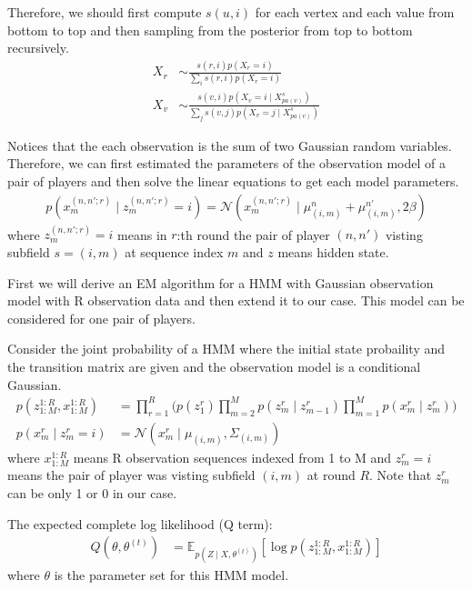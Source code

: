 \documentclass[12pt]{article}
\newenvironment{problem}[2][Problem]{\begin{trivlist}
\item[\hskip \labelsep {\bfseries #1}\hskip \labelsep {\bfseries #2.}]}{\end{trivlist}}
\begin{document}
\begin{problem}{2.5.15}
Therefore, we should first compute $s(u, i)$ for each vertex and each value 
from bottom to top and then sampling from the posterior from top to bottom
recursively.
\begin{align}
    X_r &\sim \frac{s(r,i)p(X_r =i)}{\sum_{i}s(r,i)p(X_r =i)} \\
    X_v &\sim \frac{s(v,i)p(X_v = i\mid X_{pa(v)}^{s})}
                {\sum_{j}s(v,j)p(X_v = j\mid X_{pa(v)}^{s})}
\end{align}
\end{problem}
\pagebreak
\begin{problem}{2.6.18}
Notices that the each observation is the sum of two Gaussian random variables.
Therefore, we can first estimated the parameters of the observation model of 
a pair of players and then solve the linear equations to get each model parameters.
\begin{align*}
    p(x_m^{(n,n';r)}\mid z_m^{(n,n';r)} = i) = \mathcal{N}(x_m^{(n,n';r)} 
            \mid \mu^{n}_{(i,m)} + \mu^{n'}_{(i,m)}, 2\beta)
\end{align*}
where $z_m^{(n,n';r)} = i$ means in $r$:th round the pair of player $(n, n')$ visting 
subfield $s = (i, m)$ at sequence index $m$ and $z$ means hidden state.

First we will derive an EM algorithm for a HMM with Gaussian observation model 
with R observation data and then extend it to our case. This model can be considered
for one pair of players.

Consider the joint probability of a HMM where the initial state probaility and 
the transition matrix are given and the observation model is a conditional
Gaussian.
\begin{align*}
    p(z^{1:R}_{1:M}, x^{1:R}_{1:M}) &= \prod_{r=1}^{R} \biggl(
            p(z^r_1) \prod_{m=2}^{M}p(z^r_m\mid z^r_{m-1})
            \prod_{m=1}^{M}p(x^r_m\mid z^r_m) \biggl)\\
    p(x^r_m\mid z^r_m= i) &= \mathcal{N}(x^r_m \mid \mu_{(i,m)}, \Sigma_{(i,m)})
\end{align*}
where $x^{1:R}_{1:M}$ means R observation sequences indexed from 1 to M and
$z^r_m= i$ means the pair of player was visting subfield $(i, m)$ at round $R$.
Note that $z^r_m$ can be only 1 or 0 in our case.

The expected complete log likelihood (Q term):
\begin{align*}
    Q(\theta, \theta^{(t)}) &= \mathbb{E}_{p(Z\mid X, \theta^{(t)})}[
        \log p(z^{1:R}_{1:M}, x^{1:R}_{1:M})]
\end{align*}
where $\theta$ is the parameter set for this HMM model.


\end{problem}
\end{document}
